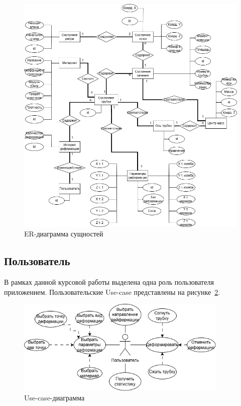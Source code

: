 \begin{figure}[H]
\centering
\includegraphics[width=1.05\textwidth]{img/er_диаграмма.jpg}
\caption{ER-диаграмма сущностей}
\label{fig:er}
\end{figure}

\subsection{Пользователь}

\noindent
\hspace{0.75cm}
В рамках данной курсовой работы выделена одна роль пользователя приложением. Пользовательские Use-case представлены на рисунке~\ref{fig:use-case}.

\begin{figure}[H]
\centering
\includegraphics[width=0.9\textwidth]{img/use-case.jpg}
\caption{Use-case-диаграмма}
\label{fig:use-case}
\end{figure}

